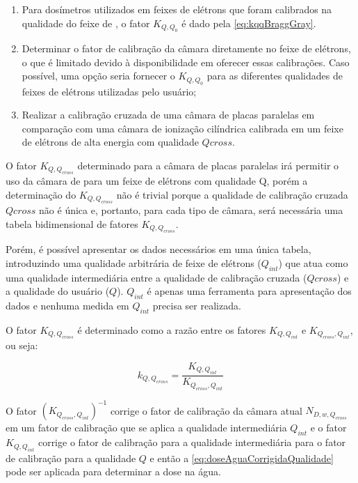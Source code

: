 \documentclass[11pt,a4paper]{article}
\begin{document}
		\begin{enumerate}
			\item Para dosímetros utilizados em feixes de elétrons que foram calibrados na qualidade do feixe de , o fator $K_{Q,Q_0}$ é dado pela \ref{eq:kqqBraggGray}. 
			
			\item Determinar o fator de calibração da câmara diretamente no feixe de elétrons, o que é limitado devido à disponibilidade em oferecer essas calibrações. Caso possível, uma opção seria fornecer o $K_{Q,Q_0}$ para as diferentes qualidades de feixes de elétrons utilizadas pelo usuário;
			
			\item Realizar a calibração cruzada de uma câmara de placas paralelas em comparação com uma câmara de ionização cilíndrica calibrada em um feixe de elétrons de alta energia com qualidade $Q{cross}$. 
		\end{enumerate}

		O fator $K_{Q,Q_{cross}}$ determinado para a câmara de placas paralelas irá permitir o uso da câmara de para um feixe de elétrons com qualidade Q, porém a determinação do $K_{Q,Q_{cross}}$ não é trivial porque a qualidade de calibração cruzada $Q{cross}$ não é única e, portanto, para cada tipo de câmara, será necessária uma tabela bidimensional de fatores $K_{Q,Q_{cross}}$.

		Porém, é possível apresentar os dados necessários em uma única tabela, introduzindo uma qualidade arbitrária de feixe de elétrons ($Q_{int}$) que atua como uma qualidade intermediária entre a qualidade de calibração cruzada ($Q{cross}$) e a qualidade do usuário ($Q$). $Q_{int}$ é apenas uma ferramenta para apresentação dos dados e nenhuma medida em $Q_{int}$ precisa ser realizada. 

		O fator $K_{Q,Q_{cross}}$ é determinado como a razão entre os fatores $K_{Q,Q_{int}}$ e $K_{Q_{cross},Q_{int}}$, ou seja:

			\begin{equation}
				k_{Q,Q_{cross}} = \frac{K_{Q,Q_{int}}}{K_{Q_{cross},Q_{int}}}
				\label{eq:kqqcross}
			\end{equation}

		O fator $(K_{Q_{cross},Q_{int}})^{-1}$ corrige o fator de calibração da câmara atual $N_{D,w,Q_{cross}}$ em um fator de calibração que se aplica a qualidade intermediária $Q_{int}$ e o fator $K_{Q,Q_{int}}$ corrige o fator de calibração para a qualidade intermediária para o fator de calibração para a qualidade $Q$ e então a  \ref{eq:doseAguaCorrigidaQualidade} pode ser aplicada para determinar a dose na água.
\end{document}
